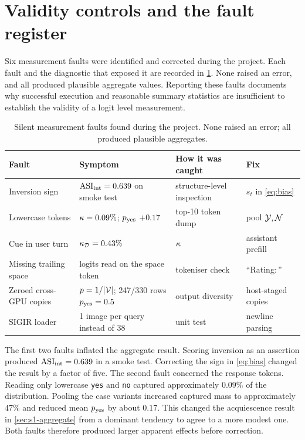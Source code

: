 \section{Validity controls and the fault register}\label{sec:design-faults}

Six measurement faults were identified and corrected during the project. Each
fault and the diagnostic that exposed it are recorded in \cref{tab:faults}.
None raised an error, and all produced plausible aggregate values. Reporting
these faults documents why successful execution and reasonable summary
statistics are insufficient to establish the validity of a logit level
measurement.

\begin{table}[htbp]\centering\small
\begin{tabularx}{\linewidth}{@{}lXXl@{}}
\toprule
Fault & Symptom & How it was caught & Fix \\
\midrule
Inversion sign & $\mathrm{ASI}_{\mathrm{int}}=0.639$ on smoke test & structure-level inspection & $s_t$ in \cref{eq:bias} \\
Lowercase tokens & $\kappa=0.09\%$; $p_{\mathrm{yes}}$ $+0.17$ & top-10 token dump & pool $\mathcal{Y},\mathcal{N}$ \\
Cue in user turn & $\kappa_{\mathcal{D}}=0.43\%$ & $\kappa$ & assistant prefill \\
Missing trailing space & logits read on the space token & tokeniser check & ``Rating:\,'' \\
Zeroed cross-GPU copies & $p=1/|\mathcal{V}|$; 247/330 rows $p_{\mathrm{yes}}=0.5$ & output diversity & host-staged copies \\
SIGIR loader & 1 image per query instead of 38 & unit test & newline parsing \\
\bottomrule
\end{tabularx}
\caption{Silent measurement faults found during the project. None raised an
error; all produced plausible aggregates.}
\label{tab:faults}
\end{table}

The first two faults inflated the aggregate result. Scoring inversion as an
assertion produced $\mathrm{ASI}_{\mathrm{int}}=0.639$ in a smoke test. Correcting the sign in
\cref{eq:bias} changed the result by a factor of five. The second fault
concerned the response tokens. Reading only lowercase \texttt{yes} and
\texttt{no} captured approximately $0.09\%$ of the distribution. Pooling the
case variants increased captured mass to approximately $47\%$ and reduced mean
$p_{\mathrm{yes}}$ by about $0.17$. This changed the acquiescence result in
\cref{sec:s1-aggregate} from a dominant tendency to agree to a more
modest one. Both faults therefore produced larger apparent effects before
correction.

